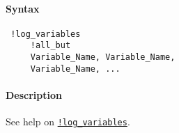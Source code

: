 


	\paragraph{Syntax}
 
 \begin{verbatim}
 !log_variables
     !all_but
     Variable_Name, Variable_Name, 
     Variable_Name, ...
 \end{verbatim}
 
 \paragraph{Description}
 
 See help on \href{modellang/logvariables}{\texttt{!log\_variables}}.


